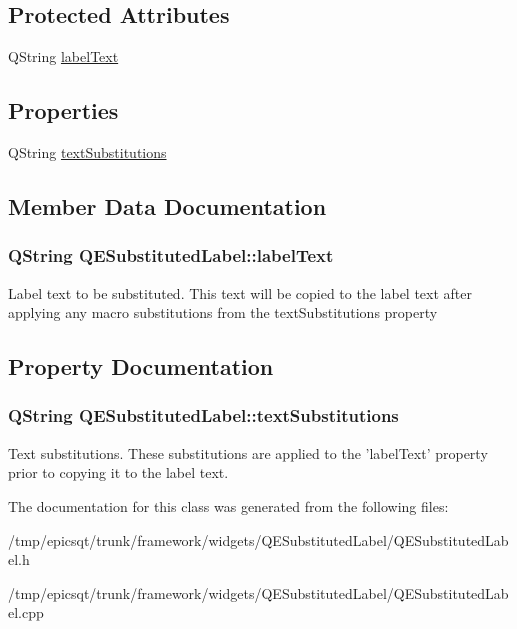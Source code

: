 \subsection*{Protected Attributes}
\begin{DoxyCompactItemize}
\item 
QString \hyperlink{classQESubstitutedLabel_af5d6d39c99f6be430f71ada4fd0579f5}{labelText}
\end{DoxyCompactItemize}
\subsection*{Properties}
\begin{DoxyCompactItemize}
\item 
QString \hyperlink{classQESubstitutedLabel_a2a3dd8e0cfb760d59cc453ff01746c83}{textSubstitutions}
\end{DoxyCompactItemize}


\subsection{Member Data Documentation}
\hypertarget{classQESubstitutedLabel_af5d6d39c99f6be430f71ada4fd0579f5}{
\subsubsection[{labelText}]{\setlength{\rightskip}{0pt plus 5cm}QString {\bf QESubstitutedLabel::labelText}}}
\label{classQESubstitutedLabel_af5d6d39c99f6be430f71ada4fd0579f5}
Label text to be substituted. This text will be copied to the label text after applying any macro substitutions from the textSubstitutions property 

\subsection{Property Documentation}
\hypertarget{classQESubstitutedLabel_a2a3dd8e0cfb760d59cc453ff01746c83}{
\subsubsection[{textSubstitutions}]{\setlength{\rightskip}{0pt plus 5cm}QString QESubstitutedLabel::textSubstitutions}}
\label{classQESubstitutedLabel_a2a3dd8e0cfb760d59cc453ff01746c83}
Text substitutions. These substitutions are applied to the 'labelText' property prior to copying it to the label text. 

The documentation for this class was generated from the following files:\begin{DoxyCompactItemize}
\item 
/tmp/epicsqt/trunk/framework/widgets/QESubstitutedLabel/QESubstitutedLabel.h\item 
/tmp/epicsqt/trunk/framework/widgets/QESubstitutedLabel/QESubstitutedLabel.cpp\end{DoxyCompactItemize}
